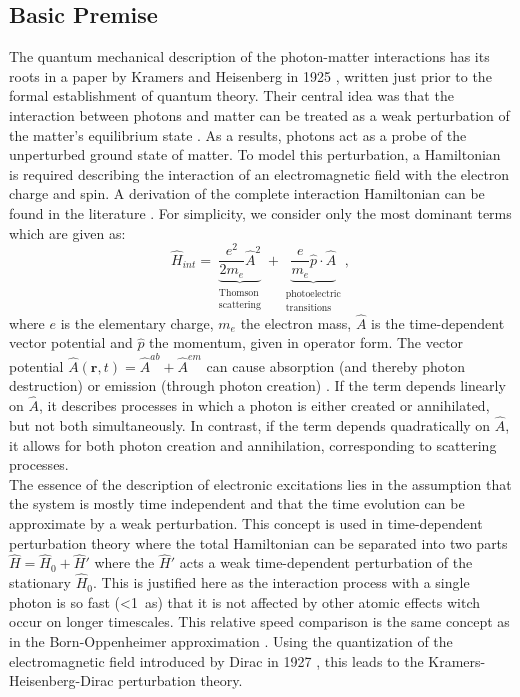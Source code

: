 \subsection{Basic Premise}
The quantum mechanical description of the photon-matter interactions has its roots in a paper by Kramers and Heisenberg in 1925 \cite{kramers1925streuung}, written just prior to the formal establishment of quantum theory. Their central idea was that the interaction between photons and matter can be treated as a weak perturbation of the matter's equilibrium state \cite{stohr2023nature}. As a results, photons act as a probe of the unperturbed ground state of matter. To model this perturbation, a Hamiltonian is required describing the interaction of an electromagnetic field with the electron charge and spin.  A derivation of the complete interaction Hamiltonian can be found in the literature \cite{stohr2023nature}. For simplicity, we consider only the most dominant terms which are given as:
\begin{equation}
    \hat{H}_{int} = \underbrace{\frac{e^{2}}{2m_{e}}\hat{A}^{2}}_{\substack{\text{Thomson}\\\text{scattering}}}
    +\underbrace{\frac{e}{m_{e}}\hat{p}\cdot\hat{A}}_{\substack{\text{photoelectric}\\\text{transitions}}} , 
    \label{eq:tot_hamiltonian}
\end{equation}
where $e$ is the elementary charge, $m_{e}$ the electron mass, $\hat{A}$ is the time-dependent vector potential and $\hat{p}$ the momentum, given in operator form. The vector potential $\hat{A}(\textbf{r},t) = \hat{A}^{ab} + \hat{A}^{em}$ can cause absorption (and thereby photon destruction) or emission (through photon creation) \cite{stohr2023nature}. If the term depends linearly on $\hat{A}$, it describes processes in which a photon is either created or annihilated, but not both simultaneously. In contrast, if the term depends quadratically on $\hat{A}$, it allows for both photon creation and annihilation, corresponding to scattering processes. \\
The essence of the description of electronic excitations lies in the assumption that the system is mostly time independent and that the time evolution can be approximate by a weak perturbation. This concept is used in time-dependent perturbation theory where the total Hamiltonian can be separated into two parts $\hat{H} = \hat{H}_{0} + \hat{H}'$ where the  $\hat{H}'$ acts a weak time-dependent perturbation of the stationary $\hat{H}_{0}$. This is justified here as the interaction process with a single photon is so fast (<\SI{1}{\atto\second}) that it is not affected by other atomic effects witch occur on longer timescales. This relative speed comparison is the same concept as in the Born-Oppenheimer approximation \cite{born_oppenheimer1927}. Using the quantization of the electromagnetic field introduced by Dirac in 1927 \cite{dirac1927quantizationEM}, this leads to the Kramers-Heisenberg-Dirac perturbation theory.
